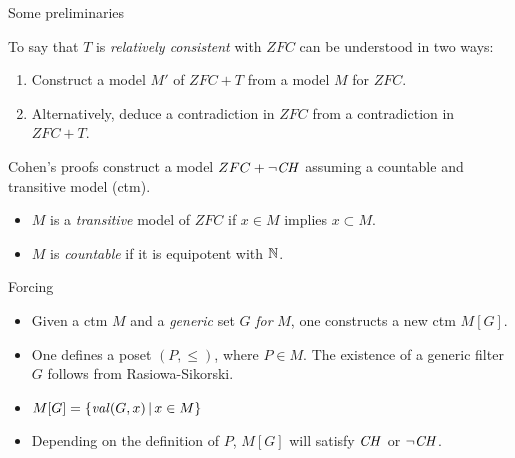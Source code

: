 \documentclass{beamer}
\begin{document}
\begin{frame}{Some preliminaries}
  \begin{block}{}
    To say that $T$ is \emph{relatively consistent} with $ZFC$ can be
    understood in two ways:
    \begin{enumerate}
    \item Construct a model $M'$ of $ZFC+T$ from a model $M$ for
      $ZFC$.
    \item Alternatively, deduce a contradiction in $ZFC$ from a
      contradiction in $ZFC+T$.%
    \end{enumerate}
  \end{block}

  \begin{block}{}
    Cohen's proofs construct a model $ZFC+\neg\mathit{CH}$ assuming a
    countable and transitive model (ctm).
  \end{block}
  \begin{itemize}
  \item  $M$ is a \emph{transitive} model of $ZFC$ if $x \in M$ implies
    $x\subset M$.
  \item $M$ is \emph{countable} if it is equipotent with $\mathbb{N}$.
  \end{itemize}

\end{frame}

\begin{frame}{Forcing}
  \begin{block}{}
    \begin{itemize}
    \item Given a ctm $M$ and a \emph{generic} set $G$ \emph{for} $M$,
      one constructs a new ctm $M[G]$.
    \item One defines a poset $(P,\leq)$, where $P \in M$. The
      existence of a generic filter $G$ follows from Rasiowa-Sikorski.
    \item $M[G] = \{\operatorname{\mathit{val}}(G,x)\, |\, x \in M \}$ 
    \item Depending on the definition of $P$, $M[G]$ will satisfy
      $\mathit{CH}$ or $\neg\mathit{CH}$.
    \end{itemize}
  \end{block}
\end{frame}
\end{document}
